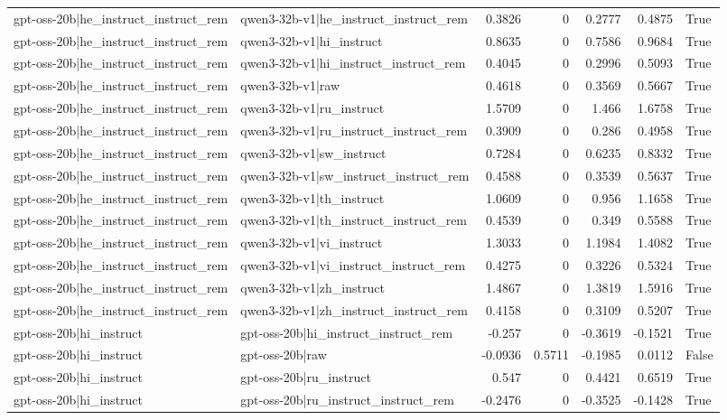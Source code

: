 \begin{table}
\begin{tabular}{l l r r r r l}
gpt-oss-20b|he_instruct_instruct_rem & qwen3-32b-v1|he_instruct_instruct_rem & 0.3826 & 0 & 0.2777 & 0.4875 & True \\
gpt-oss-20b|he_instruct_instruct_rem & qwen3-32b-v1|hi_instruct & 0.8635 & 0 & 0.7586 & 0.9684 & True \\
gpt-oss-20b|he_instruct_instruct_rem & qwen3-32b-v1|hi_instruct_instruct_rem & 0.4045 & 0 & 0.2996 & 0.5093 & True \\
gpt-oss-20b|he_instruct_instruct_rem & qwen3-32b-v1|raw & 0.4618 & 0 & 0.3569 & 0.5667 & True \\
gpt-oss-20b|he_instruct_instruct_rem & qwen3-32b-v1|ru_instruct & 1.5709 & 0 & 1.466 & 1.6758 & True \\
gpt-oss-20b|he_instruct_instruct_rem & qwen3-32b-v1|ru_instruct_instruct_rem & 0.3909 & 0 & 0.286 & 0.4958 & True \\
gpt-oss-20b|he_instruct_instruct_rem & qwen3-32b-v1|sw_instruct & 0.7284 & 0 & 0.6235 & 0.8332 & True \\
gpt-oss-20b|he_instruct_instruct_rem & qwen3-32b-v1|sw_instruct_instruct_rem & 0.4588 & 0 & 0.3539 & 0.5637 & True \\
gpt-oss-20b|he_instruct_instruct_rem & qwen3-32b-v1|th_instruct & 1.0609 & 0 & 0.956 & 1.1658 & True \\
gpt-oss-20b|he_instruct_instruct_rem & qwen3-32b-v1|th_instruct_instruct_rem & 0.4539 & 0 & 0.349 & 0.5588 & True \\
gpt-oss-20b|he_instruct_instruct_rem & qwen3-32b-v1|vi_instruct & 1.3033 & 0 & 1.1984 & 1.4082 & True \\
gpt-oss-20b|he_instruct_instruct_rem & qwen3-32b-v1|vi_instruct_instruct_rem & 0.4275 & 0 & 0.3226 & 0.5324 & True \\
gpt-oss-20b|he_instruct_instruct_rem & qwen3-32b-v1|zh_instruct & 1.4867 & 0 & 1.3819 & 1.5916 & True \\
gpt-oss-20b|he_instruct_instruct_rem & qwen3-32b-v1|zh_instruct_instruct_rem & 0.4158 & 0 & 0.3109 & 0.5207 & True \\
gpt-oss-20b|hi_instruct & gpt-oss-20b|hi_instruct_instruct_rem & -0.257 & 0 & -0.3619 & -0.1521 & True \\
gpt-oss-20b|hi_instruct & gpt-oss-20b|raw & -0.0936 & 0.5711 & -0.1985 & 0.0112 & False \\
gpt-oss-20b|hi_instruct & gpt-oss-20b|ru_instruct & 0.547 & 0 & 0.4421 & 0.6519 & True \\
gpt-oss-20b|hi_instruct & gpt-oss-20b|ru_instruct_instruct_rem & -0.2476 & 0 & -0.3525 & -0.1428 & True \\

\end{tabular}
\end{table}
